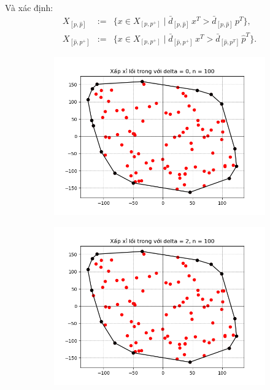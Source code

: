 \documentclass[11pt]{beamer}
\theoremstyle{definition}
\theoremstyle{plain}
\theoremstyle{plain}
\theoremstyle{remark}
\begin{document}
	\begin{frame}
	Và xác định: 
	\begin{equation}\label{ct2.50}
		\begin{array}{lcl}
			X_{[p, \hat p]} &:=& \{x \in X_{[p, p^+]} \mid \bar d_{[p, \hat p]}\, x^T > \bar d_{[p, \hat p]}\, p^T \}, \\
			X_{[\hat p, p^+]} &:=& \{x \in X_{[p, p^+]} \mid \bar d_{[\hat p, p^+]}\, x^T > \bar d_{[\hat p, p^T]}\, {\hat p}^T \}.
		\end{array}
	\end{equation}
	\end{frame}
\begin{frame}
	\begin{figure}[htbp]
		\begin{subfigure}[b]{0.4\textwidth}
			\includegraphics[width=\textwidth]{inner_delta0}
			\label{fig:inner_delta0}
		\end{subfigure}
		\hfill
		\begin{subfigure}[b]{0.4\textwidth}
			\includegraphics[width=\textwidth]{inner_delta2}
			\label{fig:inner_delta2}
		\end{subfigure}
		

\end{figure}
\end{frame}
\end{document}

